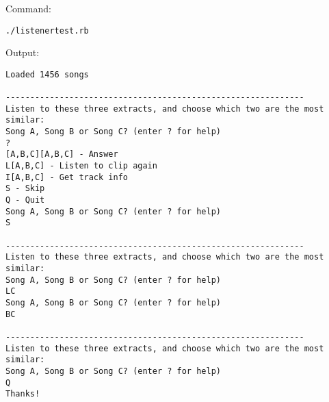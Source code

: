 Command:
\begin{verbatim}
./listenertest.rb
\end{verbatim}
Output:
\begin{verbatim}
Loaded 1456 songs

-------------------------------------------------------------
Listen to these three extracts, and choose which two are the most similar:
Song A, Song B or Song C? (enter ? for help)
?
[A,B,C][A,B,C] - Answer
L[A,B,C] - Listen to clip again
I[A,B,C] - Get track info
S - Skip
Q - Quit
Song A, Song B or Song C? (enter ? for help)
S

-------------------------------------------------------------
Listen to these three extracts, and choose which two are the most similar:
Song A, Song B or Song C? (enter ? for help)
LC
Song A, Song B or Song C? (enter ? for help)
BC

-------------------------------------------------------------
Listen to these three extracts, and choose which two are the most similar:
Song A, Song B or Song C? (enter ? for help)
Q
Thanks!
\end{verbatim}
